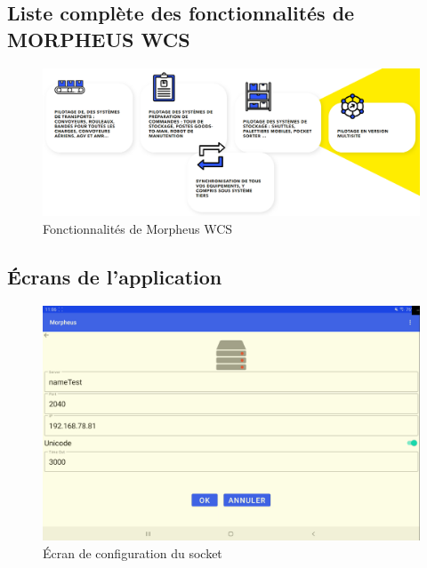 \documentclass[a4paper, 12pt, french]{article}
\begin{document}
		\subsection{Liste complète des fonctionnalités de MORPHEUS WCS}\label{appendix:morpheusWCSFonctionnalites}
			\begin{figure}[h!]
					\includegraphics[width=\linewidth]{images/morpheus_wcs_fonctionnalites.png}
					\caption{Fonctionnalités de Morpheus WCS}%
					\label{fig:morpheus_wcs_fonctionnalites}
			\end{figure}

		\newpage

		\subsection{Écrans de l'application}\label{appendix:application}
			\begin{figure}[h!]
				\begin{center}
					\includegraphics[width=0.7\linewidth]{application/config_socket.PNG}
				\end{center}
				\caption{Écran de configuration du socket}
				\label{fig:applications:config_socket}
			\end{figure}	

			\vfill
\end{document}
